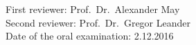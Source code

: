 
\vspace*{50pt}
\begin{flushleft}
{\LARGE First reviewer: Prof.\ Dr.\ Alexander May} \\[15pt]
{\LARGE Second reviewer: Prof.\ Dr.\ Gregor Leander} \\[15pt]
{\LARGE Date of the oral examination: 2.12.2016} \\[15pt]
\end{flushleft}

